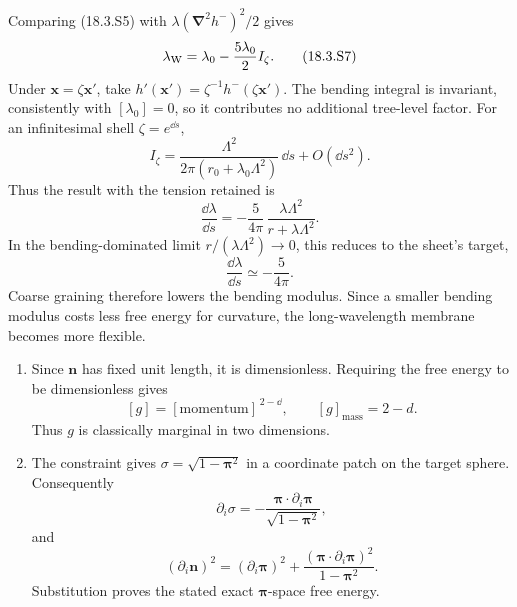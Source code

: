 \begin{enumerate}
\begin{enumerate}
    Comparing (18.3.S5) with
    \(\lambda(\boldsymbol\nabla^2h^-)^2/2\) gives
    \[
      \lambda_{\rm W}
      =\lambda_0-\frac{5\lambda_0}{2}I_\zeta.
      \tag{18.3.S7}
    \]
    Under \(\mathbf x=\zeta\mathbf x'\), take
    \(h'(\mathbf x')=\zeta^{-1}h^-(\zeta\mathbf x')\).  The bending integral
    is invariant, consistently with \([\lambda_0]=0\), so it contributes no
    additional tree-level factor.  For an infinitesimal shell
    \(\zeta=e^{\dd s}\),
    \[
      I_\zeta
      =\frac{\Lambda^2}{2\pi
        (r_0+\lambda_0\Lambda^2)}\,\dd s+O(\dd s^2).
    \]
    Thus the result with the tension retained is
    \[
      \boxed{
      \frac{\dd\lambda}{\dd s}
      =-\frac{5}{4\pi}\,
        \frac{\lambda\Lambda^2}{r+\lambda\Lambda^2}.}
      \tag{18.3.S8}
    \]
    In the bending-dominated limit
    \(r/(\lambda\Lambda^2)\to0\), this reduces to the sheet's target,
    \[
      \boxed{\frac{\dd\lambda}{\dd s}\simeq-\frac{5}{4\pi}.}
    \]
    Coarse graining therefore lowers the bending modulus.  Since a smaller
    bending modulus costs less free energy for curvature, the
    long-wavelength membrane becomes more flexible.
  \end{enumerate}

  \begin{enumerate}
    \item[(a)] Since \(\mathbf n\) has fixed unit length, it is
    dimensionless.  Requiring the free energy to be dimensionless gives
    \[
      [g]=[\text{momentum}]^{\,2-\dd},
      \qquad [g]_{\mathrm{mass}}=2-d.
    \]
    Thus \(g\) is classically marginal in two dimensions.

    \item[(b)] The constraint gives
    \(\sigma=\sqrt{1-\boldsymbol\pi^2}\) in a coordinate patch on the
    target sphere.  Consequently
    \[
      \partial_i\sigma
        =-\frac{\boldsymbol\pi\cdot\partial_i\boldsymbol\pi}
          {\sqrt{1-\boldsymbol\pi^2}},
    \]
    and
    \[
      (\partial_i\mathbf n)^2
      =(\partial_i\boldsymbol\pi)^2
       +\frac{(\boldsymbol\pi\cdot
          \partial_i\boldsymbol\pi)^2}{1-\boldsymbol\pi^2}.
    \]
    Substitution proves the stated exact \(\boldsymbol\pi\)-space free
    energy.


\end{enumerate}
\end{enumerate}
